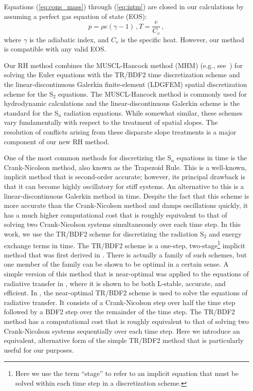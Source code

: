 \documentclass[preprint,12pt]{elsarticle}
\newcommand{\be}{\begin{equation}}
\newcommand{\ee}{\end{equation}}
\newcommand{\pec}{\, ,}
\newcommand{\lequ}[1]{\label{eq:#1}}
\newcommand{\requ}[1]{(\ref{eq:#1})}
\begin{document}
Equations \requ{cons_mass} through \requ{intm} are closed in our calculations by assuming
a perfect gas equation of state (EOS):
\begin{subequations}
\be
p=\rho e (\gamma -1)
\lequ{pressure}
\pec
\ee
\be
T = \frac{e}{C_v} \pec
\lequ{mattemp}
\ee
\end{subequations}
where $\gamma$ is the adiabatic index, and $C_v$ is the specific heat.  However, our method is compatible with any valid EOS. 

Our RH method combines the MUSCL-Hancock method (MHM) (e.g., see~\cite{toro}) for solving the Euler equations with the TR/BDF2 time discretization 
scheme and the linear-discontinuous Galerkin finite-element (LDGFEM) spatial discretization scheme for the S$_2$ equations.  
The MUSCL-Hancock method is commonly used for hydrodynamic calculations and the linear-discontinuous Galerkin scheme is the 
standard for the S$_n$ radiation equations.  While somewhat similar, these schemes vary fundamentally with respect to the 
treatment of spatial slopes.  The resolution of conflicts arising from these disparate 
slope treatments is a major component of our new RH method.

One of the most common methods for discretizing the S$_n$ equations in time is the Crank-Nicolson method, also known as the 
Trapezoid Rule. This is a well-known, implicit method that is second-order accurate; however, its principal drawback is that 
it can become highly oscillatory for stiff systems.  An alternative to this is a linear-discontinuous Galerkin method in time.  
Despite the fact that this scheme is more accurate than the Crank-Nicolson method and damps oscillations quickly, it has a 
much higher computational cost that is roughly equivalent to that of solving two Crank-Nicolson systems simultaneously over 
each time step.  In this work, we use the TR/BDF2 scheme for discretizing the radiation S$_2$ and energy exchange terms in time.  
The TR/BDF2 scheme is a one-step, two-stage\footnote{Here we use the term ``stage'' to refer to an implicit equation that must 
be solved within each time step in a discretization scheme.} implicit method that was first derived in \cite{bank}.   There is 
actually a family of such schemes, but one member of the family can be shown to be optimal in a certain sense.  A simple version 
of this method that is near-optimal was applied to the equations of radiative transfer in \cite{EM2011}, where it is shown to be 
both L-stable, accurate, and efficient.  In \cite{EM2011}, the near-optimal TR/BDF2 scheme is used to solve the equations of 
radiative transfer. It consists of a Crank-Nicolson step over half the time step followed by a BDF2 step over 
the remainder of the time step.  The TR/BDF2 method has a computational cost that is roughly equivalent to that of solving two 
Crank-Nicolson systems sequentially over each time step.  Here we introduce an equivalent,
alternative form of the simple TR/BDF2 method that is particularly useful for our purposes.  
\end{document}
